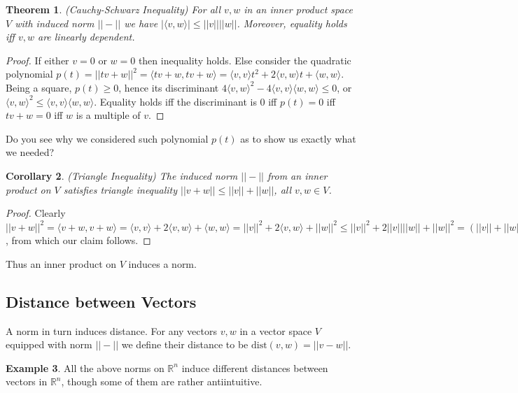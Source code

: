 \documentclass[12pt]{amsart}
\newtheorem{theorem}{Theorem}[section]
\newtheorem{corollary}[theorem]{Corollary}
\theoremstyle{definition}
\newtheorem{example}[theorem]{Example}
\begin{document}
\begin{theorem}\label{CauchySchwarz} (Cauchy-Schwarz Inequality) For all $v, w$ in an inner product space $V$ with induced norm $||-||$ we have $|\langle v, w \rangle| \leq ||v|| ||w||$. Moreover, equality holds iff $v, w$ are linearly dependent.
\end{theorem}
\begin{proof} If either $v = 0$ or $w = 0$ then inequality holds. Else consider the quadratic polynomial $p(t) = ||tv + w||^2 = \langle tv + w, tv + w \rangle = \langle v, v \rangle t^2 + 2\langle v, w \rangle t + \langle w, w \rangle$. Being a square, $p(t) \geq 0$, hence its discriminant $4\langle v, w \rangle^2 - 4\langle v, v \rangle \langle w, w \rangle \leq 0$, or $\langle v, w \rangle^2 \leq \langle v, v \rangle \langle w, w \rangle$. Equality holds iff the discriminant is 0 iff $p(t) = 0$ iff $tv + w = 0$ iff $w$ is a multiple of $v$.
\end{proof}

 Do you see why we considered such polynomial $p(t)$ as to show us exactly what we needed?
\begin{corollary}\label{triangleinequality} (Triangle Inequality) The induced norm $||-||$ from an inner product on $V$ satisfies triangle inequality $||v + w|| \leq ||v|| + ||w||$, all $v, w \in V$.
\end{corollary} 
\begin{proof} Clearly $||v + w||^2 = \langle v+w, v+w \rangle = \langle v, v \rangle + 2\langle v, w \rangle + \langle w, w \rangle = ||v||^2 + 2 \langle v, w \rangle + ||w||^2 \leq ||v||^2 + 2||v|| ||w|| + ||w||^2 = (||v|| + ||w||)^2$, from which our claim follows.
\end{proof}

Thus an inner product on $V$ induces a norm.

\subsection{Distance between Vectors} A norm in turn induces distance.
\dfn For any vectors $v, w$ in a vector space $V$ equipped with norm $||-||$ we define their distance to be $\text{dist}(v, w) = ||v - w||$.

\begin{example} All the above norms on $\mathbb{R}^n$ induce different distances between vectors in $\mathbb{R}^n$, though some of them are rather antiintuitive.
\end{example}
\end{document}
